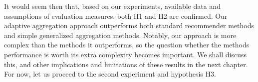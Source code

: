It would seem then that, based on our experiments, available data
and assumptions of evaluation measures, both H1 and H2 are confirmed.
Our adaptive aggregation approach outperforms both standard recommender
methods and simple generalized aggregation methods.
Notably, our approach is more complex than the methods it outperforms,
so the question whether the methods performance is worth its extra complexity becomes important.
We shall discuss this, and other implications and limitations of these results in the next chapter.
For now, let us proceed to the second experiment and hypothesis H3.

